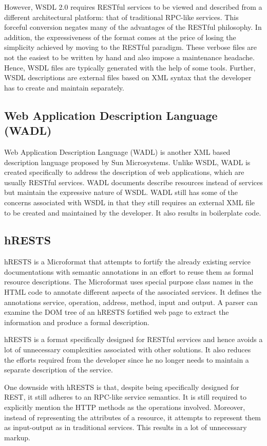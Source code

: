 \documentclass[journal]{IEEEtran}
\begin{document}
However, WSDL 2.0 requires RESTful services to be viewed and described from a different architectural platform: that of traditional RPC-like services. This forceful conversion negates many of the advantages of the RESTful philosophy. In addition, the expressiveness of the format comes at the price of losing the simplicity achieved by moving to the RESTful paradigm. These verbose files are not the easiest to be written by hand and also impose a maintenance headache. Hence, WSDL files are typically generated with the help of some tools. Further, WSDL descriptions are external files based on XML syntax that the developer has to create and maintain separately. 

\subsection{Web Application Description Language (WADL)}
Web Application Description Language (WADL)\cite{hadley2006web} is another XML based description language proposed by Sun Microsystems. Unlike WSDL, WADL is created specifically to address the description of web applications, which are usually RESTful services. WADL documents describe resources instead of services but maintain the expressive nature of WSDL. 
WADL still has some of the concerns associated with WSDL in that they still requires an external XML file to be created and maintained by the developer. It also results in boilerplate code. 

\subsection{hRESTS} 
hRESTS\cite{kopecky2008hrests} is a Microformat that attempts to fortify the already existing service documentations with semantic annotations in an effort to reuse them as formal resource descriptions. The Microformat uses special purpose class names in the HTML code to annotate different aspects of the associated services. It defines the annotations service, operation, address, method, input and output. A parser can examine the DOM tree of an hRESTS fortified web page to extract the information and produce a formal description. 

hRESTS is a format specifically designed for RESTful services and hence avoids a lot of unnecessary complexities associated with other solutions. It also reduces the efforts required from the developer since he no longer needs to  maintain a separate description of the service.   

One downside with hRESTS is that, despite being specifically designed for REST, it still adheres to an RPC-like service semantics. It is still required to explicitly mention the HTTP methods as the operations involved. Moreover, instead of representing the attributes of a resource, it attempts to represent them as input-output as in traditional services. This results in a lot of unnecessary markup.
\end{document}
